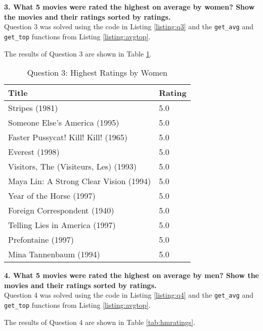 \textbf{3. What 5 movies were rated the highest on average by women? Show the movies and their ratings sorted by ratings.}\\

Question 3 was solved using the code in Listing \ref{listing:q3} and the {\tt get\_avg} and {\tt get\_top} functions from Listing \ref{listing:avgtop}.



The results of Question 3 are shown in Table \ref{tab:hwratings}.

\begin{table}[h!]
\centering
\begin{tabular}{| l | l |}
\hline
Title & Rating \\
\hline
Stripes (1981) & 5.0 \\
Someone Else's America (1995) & 5.0 \\
Faster Pussycat! Kill! Kill! (1965) & 5.0 \\
Everest (1998) & 5.0 \\
Visitors, The (Visiteurs, Les) (1993) & 5.0 \\
Maya Lin: A Strong Clear Vision (1994) & 5.0 \\
Year of the Horse (1997) & 5.0 \\
Foreign Correspondent (1940) & 5.0 \\
Telling Lies in America (1997) & 5.0 \\
Prefontaine (1997) & 5.0 \\
Mina Tannenbaum (1994) & 5.0 \\
\hline
\end{tabular}
\caption{Question 3: Highest Ratings by Women}
\label{tab:hwratings}
\end{table}

\clearpage

\textbf{4. What 5 movies were rated the highest on average by men? Show the movies and their ratings sorted by ratings.}\\

Question 4 was solved using the code in Listing \ref{listing:q4} and the {\tt get\_avg} and {\tt get\_top} functions from Listing \ref{listing:avgtop}.



The results of Question 4 are shown in Table \ref{tab:hmratings}.

